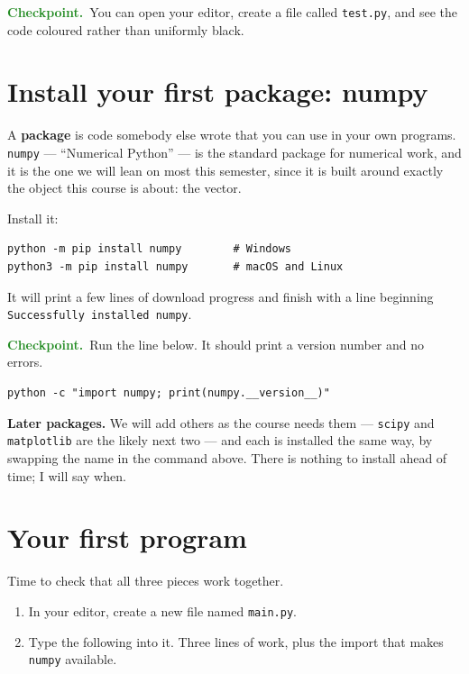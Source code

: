 \documentclass[11pt]{article}
\newcommand{\checkpoint}[1]{\par\smallskip\noindent
  {\small\sffamily\textcolor{ForestGreen}{\textbf{Checkpoint.}}\ #1}\par\smallskip}
\begin{document}
\checkpoint{You can open your editor, create a file called \texttt{test.py}, and
see the code coloured rather than uniformly black.}

\section{Install your first package: numpy}
A \textbf{package} is code somebody else wrote that you can use in your own
programs. \texttt{numpy} --- ``Numerical Python'' --- is the standard package
for numerical work, and it is the one we will lean on most this semester, since
it is built around exactly the object this course is about: the vector.

\medskip
\noindent Install it:

\begin{lstlisting}
python -m pip install numpy        # Windows
python3 -m pip install numpy       # macOS and Linux
\end{lstlisting}

\noindent It will print a few lines of download progress and finish with a line
beginning \texttt{Successfully installed numpy}.

\checkpoint{Run the line below. It should print a version number and no errors.}

\begin{lstlisting}
python -c "import numpy; print(numpy.__version__)"
\end{lstlisting}

\medskip
\noindent \textbf{Later packages.} We will add others as the course needs them
--- \texttt{scipy} and \texttt{matplotlib} are the likely next two --- and each
is installed the same way, by swapping the name in the command above. There is
nothing to install ahead of time; I will say when.

\section{Your first program}
Time to check that all three pieces work together.

\begin{enumerate}[leftmargin=2.0em,itemsep=4pt]
  \item In your editor, create a new file named \texttt{main.py}.
  \item Type the following into it. Three lines of work, plus the import that
        makes \texttt{numpy} available.
\end{enumerate}
\end{document}
